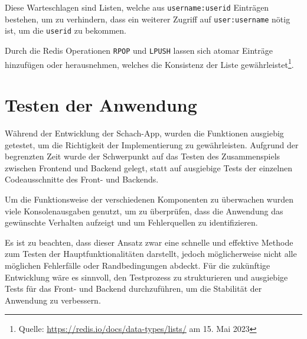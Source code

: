 Diese Warteschlagen sind Listen, welche aus \verb|username:userid| Einträgen bestehen, um zu verhindern, dass ein weiterer Zugriff auf \verb|user:username| nötig ist, um die \verb|userid| zu bekommen. 

Durch die Redis Operationen \verb|RPOP| und \verb|LPUSH| lassen sich atomar Einträge hinzufügen oder herausnehmen, welches die Konsistenz der Liste gewährleistet\footnote{Quelle: \url{https://redis.io/docs/data-types/lists/} am 15. Mai 2023}.

\section{Testen der Anwendung}
Während der Entwicklung der Schach-App, wurden die Funktionen ausgiebig getestet, um die Richtigkeit der Implementierung zu gewährleisten. Aufgrund der begrenzten Zeit wurde der Schwerpunkt auf das Testen des Zusammenspiels zwischen Frontend und Backend gelegt, statt auf ausgiebige Tests der einzelnen Codeausschnitte des Front- und Backends.

Um die Funktionsweise der verschiedenen Komponenten zu überwachen wurden viele Konsolenausgaben genutzt, um zu überprüfen, dass die Anwendung das gewünschte Verhalten aufzeigt und um Fehlerquellen zu identifizieren.

Es ist zu beachten, dass dieser Ansatz zwar eine schnelle und effektive Methode zum Testen der Hauptfunktionalitäten darstellt, jedoch möglicherweise nicht alle möglichen Fehlerfälle oder Randbedingungen abdeckt. Für die zukünftige Entwicklung wäre es sinnvoll, den Testprozess zu strukturieren und ausgiebige Tests für das Front- und Backend durchzuführen, um die Stabilität der Anwendung zu verbessern.
